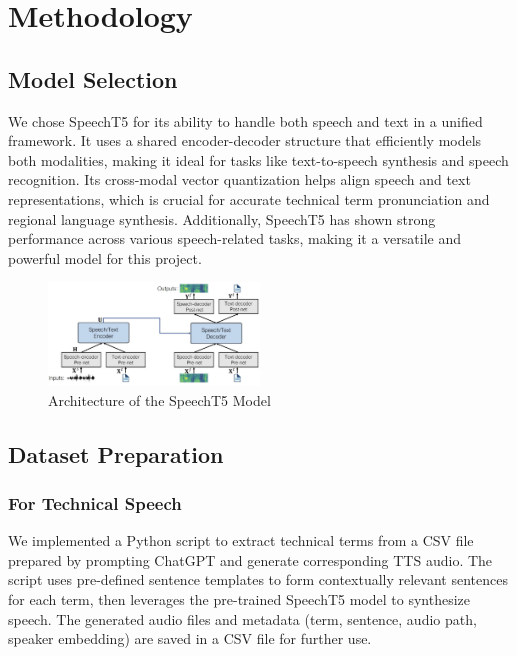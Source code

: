\documentclass[conference]{IEEEtran}
\begin{document}
\section{Methodology}

\subsection{Model Selection}

We chose SpeechT5 for its ability to handle both speech and text in a unified framework. It uses a shared encoder-decoder structure that efficiently models both modalities, making it ideal for tasks like text-to-speech synthesis and speech recognition. Its cross-modal vector quantization helps align speech and text representations, which is crucial for accurate technical term pronunciation and regional language synthesis. Additionally, SpeechT5 has shown strong performance across various speech-related tasks, making it a versatile and powerful model for this project.

\begin{figure}[htbp]
\centerline{\includegraphics[width=0.5\textwidth]{architecture.jpg}}
\caption{Architecture of the SpeechT5 Model}
\label{fig}
\end{figure}
\subsection{Dataset Preparation}

\subsubsection{For Technical Speech}

We implemented a Python script to extract technical terms from a CSV file prepared by prompting ChatGPT and generate corresponding TTS audio. The script uses pre-defined sentence templates to form contextually relevant sentences for each term, then leverages the pre-trained SpeechT5 model to synthesize speech. The generated audio files and metadata (term, sentence, audio path, speaker embedding) are saved in a CSV file for further use.
\end{document}
